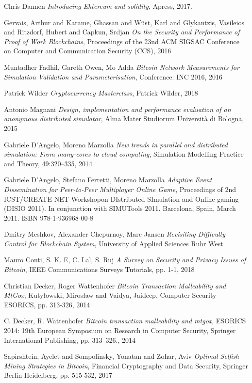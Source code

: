 \begin{thebibliography}{99}
 Chris Dannen
{\em Introducing Ehtereum and solidity},
Apress, 2017.

 Gervais, Arthur and Karame, Ghassan and Wüst, Karl and Glykantzis, Vasileios and Ritzdorf, Hubert and Capkun, Srdjan
{\em On the Security and Performance of Proof of Work Blockchains},
Proceedings of the 23nd ACM SIGSAC Conference on Computer and Communication Security (CCS), 2016

 Muntadher Fadhil, Gareth Owen, Mo Adda
{\em Bitcoin Network Measurements for Simulation Validation and Parameterisation},
Conference: INC 2016, 2016

 Patrick Wilder
{\em Cryptocurrency Masterclass},
Patrick Wilder, 2018

 Antonio Magnani
{\em Design, implementation and performance evaluation of an anonymous distributed simulator},
Alma Mater Studiorum Università di Bologna, 2015

 Gabriele D'Angelo, Moreno Marzolla
{\em New trends in parallel and distributed simulation: From many-cores to cloud computing},
Simulation Modelling Practice and Theory, 49:320–335, 2014

 Gabriele D'Angelo, Stefano Ferretti, Moreno Marzolla
{\em Adaptive Event Dissemination for Peer-to-Peer Multiplayer Online Game},
Proceedings of 2nd ICST/CREATE-NET Workshopon DIstributed SImulation and Online gaming (DISIO 2011).
In conjunction with SIMUTools 2011. Barcelona, Spain, March 2011. ISBN 978-1-936968-00-8

 Dmitry Meshkov, Alexander Chepurnoy, Marc Jansen
{\em Revisiting Difficulty Control for Blockchain System},
University of Applied Sciences Ruhr West

 Mauro Conti, S. K. E, C. Lal, S. Ruj
{\em A Survey on Security and Privacy Issues of Bitcoin}, 
IEEE Communications Surveys Tutorials, pp. 1-1, 2018

 Christian Decker, Roger Wattenhofer
{\em Bitcoin Transaction Malleability and MtGox},
Kuty{\l}owski, Miros{\l}aw and Vaidya, Jaideep, Computer Security - ESORICS, pp. 313-326, 2014

\bibitem C. Decker, R.  Wattenhofer
{\em Bitcoin  transaction  malleability  and mtgox},
ESORICS 2014: 19th European Symposium on Research in Computer Security, Springer International Publishing, pp. 313–326., 2014

 Sapirshtein, Ayelet and Sompolinsky, Yonatan and Zohar, Aviv
{\em Optimal Selfish Mining Strategies in Bitcoin},
Financial Cryptography and Data Security, Springer Berlin Heidelberg, pp. 515-532, 2017


\end{thebibliography}

